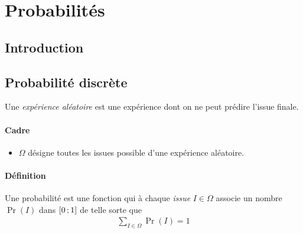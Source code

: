 \documentclass[main.tex]{subfiles}
\begin{document}
\onlyinsubfile{%
    \maketitle
    \tableofcontents
}

\chapter{Probabilités}

\section{Introduction}

\section{Probabilité discrète}

\begin{definition}

    Une \emph{expérience aléatoire} est une expérience
    dont on ne peut prédire l'issue finale.
\end{definition}

\begin{definition}

    \subsubsection{Cadre}
    \begin{itemize}
        \item $\Omega$ désigne toutes les issues possible d'une expérience aléatoire.
    \end{itemize}

    \subsubsection{Définition}
    Une probabilité est une fonction qui à chaque \emph{issue} $I \in \Omega$
    associe un nombre $\Pr(I)$ dans $\mathopen{[}0\,;1\mathclose{]}$ de telle sorte que
    \begin{align}
        \sum_{I \in \Omega} \Pr(I) = 1
    \end{align}
\end{definition}
\end{document}
